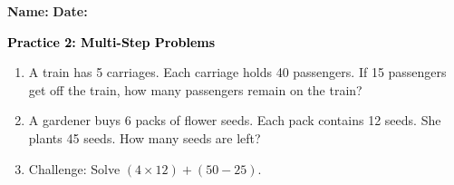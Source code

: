 \documentclass[12pt, letterpaper, fleqn]{article}
\begin{document}
\textbf{Name:} \underline{\hspace{5cm}}
\hfill
\textbf{Date:} \underline{\hspace{3cm}}\\

\begin{tcolorbox}[colback=customteal!20]
    \large\textcolor{black}{\textbf{Practice 2: Multi-Step Problems}}
\end{tcolorbox}

\vspace{5mm}
\begin{enumerate}[itemsep=3.5cm, leftmargin=0.6cm]
\item A train has 5 carriages. Each carriage holds 40 passengers. If 15 passengers get off the train, how many passengers remain on the train?
\vspace{3.5cm}

\item A gardener buys 6 packs of flower seeds. Each pack contains 12 seeds. She plants 45 seeds. How many seeds are left?
\vspace{3.5cm}

\item Challenge: Solve $(4 \times 12) + (50 - 25)$.
\end{enumerate}
\end{document}
